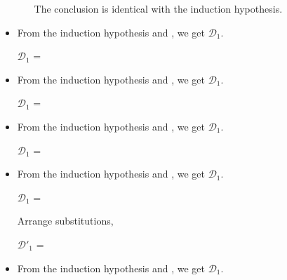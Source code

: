 \begin{itemize}
\begin{itemize}
	      	      The conclusion is identical with the induction hypothesis.
	      	      	      	      
	      \end{itemize}
	      	      
	\item \QRefl
	      	      
	      From the induction hypothesis and \QRefl, we get $\mathcal{D}_1$.
	      	      
	      $\mathcal{D}_1$ = 
	      {}
	      	      
	\item \QSym
	      	      
	      From the induction hypothesis and \QSym, we get $\mathcal{D}_1$.
	      	      
	      $\mathcal{D}_1$ = 
	      {}
	      	      
	\item \QTrans
	      	      
	      From the induction hypothesis and \QTrans, we get $\mathcal{D}_1$.
	      	      
	      $\mathcal{D}_1$ = 
	      { \andalso {}}
	      	      
	\item \QBeta
	      	      
	      From the induction hypothesis and \QBeta, we get $\mathcal{D}_1$.
	      	      
	      $\mathcal{D}_1$ = 
	      { \andalso {}}
	      	      
	      Arrange substitutions,
	      	      
	      $\mathcal{D}'_1$ = 
	      { \andalso {}}
	      	      
	\item \QEta
	      	      
	      From the induction hypothesis and \QEta, we get $\mathcal{D}_1$.
	      	      

\end{itemize}

